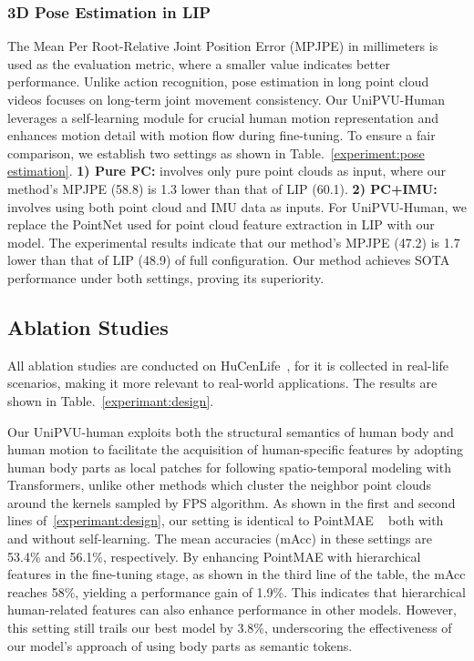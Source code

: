 \subsubsection{3D Pose Estimation in LIP}
The Mean Per Root-Relative Joint Position Error (MPJPE) in millimeters is used as the evaluation metric, where a smaller value indicates better performance. Unlike action recognition, pose estimation in long point cloud videos focuses on long-term joint movement consistency. Our UniPVU-Human leverages a self-learning module for crucial human motion representation and enhances motion detail with motion flow during fine-tuning.
To ensure a fair comparison, we establish two settings as shown in Table.~\ref{experiment:pose estimation}.
\textbf{\textcolor[RGB]{230,150,0}{\textbf{1)}}  Pure PC: } involves only pure point clouds as input, where our method's MPJPE (58.8) is 1.3 lower than that of LIP (60.1).
\textbf{\textcolor[RGB]{230,150,0}{\textbf{2)}}  PC+IMU: } involves using both point cloud and IMU data as inputs. For UniPVU-Human, we replace the PointNet used for point cloud feature extraction in LIP with our model.
The experimental results indicate that our method's MPJPE (47.2) is 1.7 lower than that of LIP (48.9) of full configuration. 
Our method achieves SOTA performance under both settings, proving its superiority. 




\subsection{Ablation Studies}
All ablation studies are conducted on HuCenLife~\cite{xu2023human}, for it is collected in real-life scenarios, making it more relevant to real-world applications.
The results are shown in Table.~\ref{experimant:design}.

Our UniPVU-human exploits both the structural semantics of human body and human motion to facilitate the acquisition of human-specific features by adopting human body parts as local patches for following spatio-temporal modeling with Transformers, unlike other methods which cluster the neighbor point clouds around the kernels sampled by FPS algorithm.
As shown in the first and second lines of~\ref{experimant:design}, our setting is identical to PointMAE ~\cite{pang2022masked} both with and without self-learning. The mean accuracies (mAcc) in these settings are 53.4\% and 56.1\%, respectively.
By enhancing PointMAE with hierarchical features in the fine-tuning stage, as shown in the third line of the table, the mAcc reaches 58\%, yielding a performance gain of 1.9\%. This indicates that hierarchical human-related features can also enhance performance in other models.
However, this setting still trails our best model by 3.8\%, underscoring the effectiveness of our model's approach of using body parts as semantic tokens.


